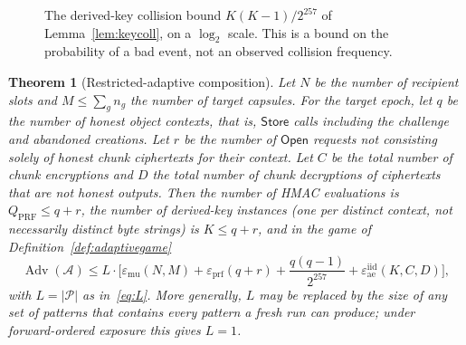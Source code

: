 \documentclass[pdflatex,sn-mathphys-num]{sn-jnl}
\theoremstyle{plain}
\newtheorem{theorem}{Theorem}
\theoremstyle{definition}
\newcommand{\Adv}{\operatorname{Adv}}
\begin{document}
\begin{figure}[htbp]
\centering

\caption{The derived-key collision bound $K(K-1)/2^{257}$ of Lemma~\ref{lem:keycoll}, on a $\log_2$ scale. This is a bound on the probability of a bad event, not an observed collision frequency.}\label{fig:keycoll}
\end{figure}

\begin{keyresult}
\begin{theorem}[Restricted-adaptive composition]\label{thm:adaptive}
Let $N$ be the number of recipient slots and $M\le\sum_gn_g$ the number of target capsules. For the target epoch, let $q$ be the number of honest object contexts, that is, $\mathsf{Store}$ calls including the challenge and abandoned creations. Let $r$ be the number of $\mathsf{Open}$ requests not consisting solely of honest chunk ciphertexts for their context. Let $C$ be the total number of chunk encryptions and $D$ the total number of chunk decryptions of ciphertexts that are not honest outputs. Then the number of HMAC evaluations is $Q_{\mathrm{PRF}}\le q+r$, the number of derived-key \emph{instances} (one per distinct context, not necessarily distinct byte strings) is $K\le q+r$, and in the game of Definition~\ref{def:adaptivegame}
\begin{equation}\label{eq:adaptive}
 \Adv(\mathcal A)\le L\cdot\Big[\varepsilon_{\mathrm{mu}}(N,M)+\varepsilon_{\mathrm{prf}}(q+r)+\frac{q(q-1)}{2^{257}}+\varepsilon^{\mathrm{iid}}_{\mathrm{ae}}(K,C,D)\Big],
\end{equation}
with $L=|\mathcal P|$ as in~\eqref{eq:L}. More generally, $L$ may be replaced by the size of any set of patterns that contains every pattern a fresh run can produce; under forward-ordered exposure this gives $L=1$.
\end{theorem}
\end{keyresult}
\end{document}
